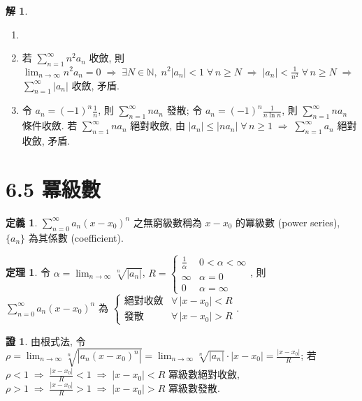 \documentclass[12pt]{extarticle}
\newcommand{\ds}{\displaystyle}
\newcommand{\ie}{\;\Longrightarrow\;}
\theoremstyle{definition}
\newtheorem*{dfn}{定義}
\newtheorem*{thm}{定理}
\newtheorem*{sol}{解}
\newtheorem*{prf}{證}
\begin{document}
\begin{sol}
  \begin{enumerate}\setlength{\itemsep}{0pt}
    \item[]
    \item 若 $\ds\sum_{n = 1}^\infty n^2 a_n$ 收斂, 則 $\ds\lim_{n\to\infty} n^2 a_n = 0 \ie \exists N\in\mathbb{N}, \;n^2 |a_n| < 1\;\forall\,n\geqslant N \ie |a_n| < \frac{1}{n^2}\;\forall\,n\geqslant N \ie$ $\ds\sum_{n = 1}^\infty |a_n|$ 收斂, 矛盾.  
    \item 令 $\ds a_n = (-1)^n\frac{1}{n}$, 則 $\ds\sum_{n = 1}^\infty n a_n$ 發散; 令 $\ds a_n = (-1)^n\frac{1}{n\ln n}$, 則 $\ds\sum_{n = 1}^\infty n a_n$ 條件收斂. 若 $\ds\sum_{n = 1}^\infty n a_n$ 絕對收斂, 由 $\ds|a_n|\leqslant|n a_n|\;\forall\,n\geqslant 1\ie \sum_{n = 1}^\infty a_n$ 絕對收斂, 矛盾. 
  \end{enumerate}
\end{sol}

\section*{6.5 冪級數}

\begin{dfn}
  $\ds\sum_{n = 0}^\infty a_n (x - x_0)^n$ 之無窮級數稱為 $x - x_0$ 的冪級數 (power series), $\{a_n\}$ 為其係數 (coefficient). 
\end{dfn}

\begin{thm}
  令 $\ds\alpha = \lim_{n\to\infty}\sqrt[n]{|a_n|}$, $\ds R = \begin{cases}\frac{1}{\alpha} & 0 < \alpha < \infty \\ \infty & \alpha = 0 \\ 0 & \alpha = \infty\end{cases}$, 則 $\ds\sum_{n = 0}^\infty a_n (x - x_0)^n$ 為 $\begin{cases}\text{絕對收斂} & \forall\,|x - x_0| < R \\ \text{發散} & \forall\,|x - x_0| > R\end{cases}$. 
\end{thm}

\begin{prf}
  由根式法, 令 $\ds\rho = \lim_{n\to\infty}\sqrt[n]{|a_n(x - x_0)^n|} = \lim_{n\to\infty}\sqrt[n]{|a_n|}\cdot|x - x_0| = \frac{|x - x_0|}{R}$; 若 $\ds\rho < 1 \ie \frac{|x - x_0|}{R} < 1 \ie |x - x_0| < R $ 冪級數絕對收斂, $\ds\rho > 1 \ie \frac{|x - x_0|}{R} > 1 \ie |x - x_0| > R$ 冪級數發散. 
\end{prf}
\end{document}
